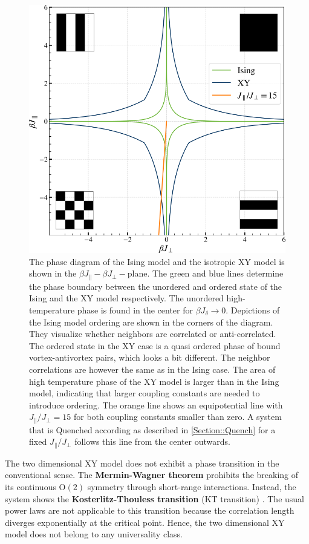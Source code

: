 	\begin{figure}
		\centering
		\includegraphics[width=0.8\linewidth]{graphics/Phase-diagram-Ising-XY-clean.png}
		\caption{The phase diagram of the Ising model and the isotropic XY model is shown in the $\beta J_\parallel-\beta J_\perp-$plane. The green and blue lines determine the phase boundary between the unordered and ordered state of the Ising and the XY model respectively. The unordered high-temperature phase is found in the center for $\beta J_\delta \rightarrow 0$. Depictions of the Ising model ordering are shown in the corners of the diagram. They visualize whether neighbors are correlated or anti-correlated. The ordered state in the XY case is a quasi ordered phase of bound vortex-antivortex pairs, which looks a bit different. The neighbor correlations are however the same as in the Ising case. The area of high temperature phase of the XY model is larger than in the Ising model, indicating that larger coupling constants are needed to introduce ordering. The orange line shows an equipotential line with $J_\parallel /	J_\perp =	15$ for both coupling constants smaller than zero. A system that is Quenched according as described in \autoref{Section::Quench} for a fixed $J_\parallel /	J_\perp$ follows this line from the center outwards.}
		\label{Fig::XY-Ising-PD}
	\end{figure}
	
	The two dimensional XY model does not exhibit a phase transition in the conventional sense. The \textbf{Mermin-Wagner theorem} \cite{mermin1966absence} prohibits the breaking of its continuous $\text{O}(2)$ symmetry through short-range interactions. Instead, the system shows the \textbf{Kosterlitz-Thouless transition} (KT transition) \cite{JMKosterlitz_1973, berezinskii1971destruction}. The usual power laws are not applicable to this transition because the correlation length diverges exponentially at the critical point. Hence, the two dimensional XY model does not belong to any universality class. \\
	
